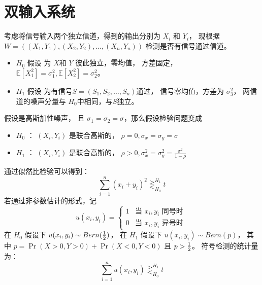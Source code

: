 \documentclass{ctexart}
\numberwithin{equation}{section}
\def\E{\mathbb{E}}
\begin{document}
\section{双输入系统}
考虑将信号输入两个独立信道，得到的输出分别为 $X_i$ 和 $Y_i$， 现根据 $W =
((X_1, Y_1), (X_2, Y_2), \dots, (X_n, Y_n)) $ 检测是否有信号通过信道。
\begin{itemize}
\item $H_0$ 假设 为 $X$和 $Y$ 彼此独立，零均值， 方差固定， 
$\E[X_1^2] = \sigma_1^2, \E[X_2^2] = \sigma_2^2$。
\item $H_1$ 假设 为有信号$S = (S_1, S_2, \dots, S_n) $通过， 信号零均值，方差为 $\sigma_3^2$，
两信道的噪声分量与 $H_0$中相同，与$S$独立。
\end{itemize}
假设是高斯加性噪声， 且 $\sigma_1 = \sigma_2 = \sigma $，那么假设检验问题变成
\begin{itemize}
\item $H_0$ ： $(X_i, Y_i) $ 是联合高斯的， $ \rho = 0, \sigma_x = \sigma_y = \sigma $
\item $H_1$ ： $(X_i, Y_i) $ 是联合高斯的， $ \rho > 0, \sigma_x^2 = \sigma_y^2 = \frac{\sigma^2}{1 - \rho} $
\end{itemize}
通过似然比检验可以得到：
\begin{equation}
\sum_{i=1}^n (x_i + y_i)^2 \mathop{\gtreqless}_{H_0}^{H_1} t
\end{equation}
若通过非参数估计的形式，记 $$
u(x_i, y_i) = \begin{cases} 1 & \textrm{当 $x_i, y_i$ 同号时 } \\
0 & \textrm{当 $x_i, y_i$ 异号时 }
\end{cases}
$$
在 $H_0$ 假设下 $u(x_i, y_i) \sim Bern({ 1\over 2})$， 在 $H_1 $ 假设下 $ u(x_i, y_i) \sim Bern(p)$， 其中 $p = \Pr(X>0, Y>0)  + \Pr(X<0, Y<0) $
且  $ p > {1 \over 2} $。
符号检测的统计量为：
$$
 \sum_{i = 1}^n u(x_i, y_i) \mathop{\gtreqless}_{H_0}^{H_1} t
$$
\end{document}
